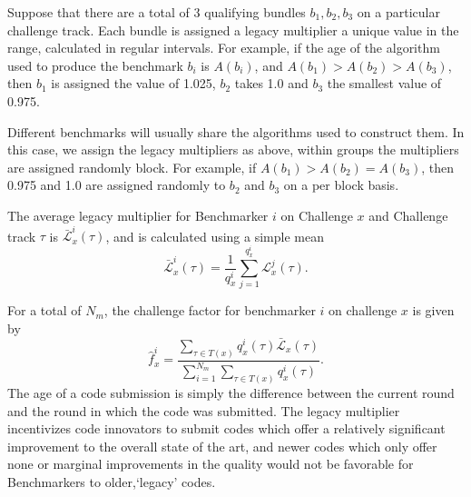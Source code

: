 \documentclass{contract}
\def\f{\hat{f}}
\numberwithin{equation}{section}
\begin{document}
Suppose that there are a total of 3 qualifying bundles $b_1,b_2,b_3$ on a particular challenge track. 
Each bundle is assigned a legacy multiplier a unique value in the range, calculated in regular intervals.
For example, if the age of the algorithm used to produce  the benchmark $b_i$ is $A(b_i)$, and  $A(b_1) > A(b_2) > A(b_3)$, then $b_1$ is assigned the value of 1.025, $b_2$ takes 1.0 and $b_3$ the smallest value of 0.975. 

Different benchmarks will usually share the algorithms used to construct them.
In this case, we assign the legacy multipliers as above, within groups the multipliers are assigned randomly block.
For example, if $A(b_1)> A(b_2) = A(b_3)$, then 0.975 and 1.0 are assigned randomly to $b_2$ and $b_3$ on a per block basis.



The average legacy multiplier for Benchmarker $i$ on Challenge $x$ and Challenge track $\tau$ is $\bar{\mathcal{L}}^i_x(\tau)$, and is calculated using a simple mean
\begin{equation}
    \bar{\mathcal{L}}^i_x(\tau) = \frac{1}{q^i_x}\sum_{j=1}^{q^i_x} \mathcal{L}^j_x(\tau).
\end{equation}

For a total of $N_m$, the challenge factor for benchmarker $i$ on challenge $x$ is given by 
\begin{equation}
    \f_x^i = \frac{\sum_{\tau\in T(x)} q_x^i(\tau) \bar{\mathcal{L}}_x(\tau)}{\sum_{i=1}^{N_m}\sum_{\tau\in T(x)}q_x^i(\tau)}.
    \label{eq:challenge-factor-defn}
\end{equation}
The age of a code submission is simply the difference between the current round and the round in which the code was submitted. 
The legacy multiplier incentivizes code innovators to submit codes which offer a relatively significant improvement to the overall state of the art, and newer codes which only offer none or marginal improvements in the quality would not be favorable for Benchmarkers to older,`legacy' codes. 
\end{document}
